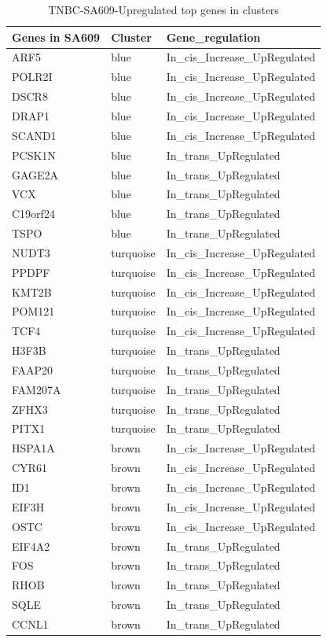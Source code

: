 \begin{table}[htbp]
   \centering
   \caption{TNBC-SA609-Upregulated top genes in clusters}
     \begin{tabular}{|l|l|l|}
     \hline
     Genes in SA609 & Cluster & Gene\_regulation \\
     \hline
     ARF5 & blue & In\_cis\_Increase\_UpRegulated \\
     POLR2I & blue & In\_cis\_Increase\_UpRegulated \\
     DSCR8 & blue & In\_cis\_Increase\_UpRegulated \\
     DRAP1 & blue & In\_cis\_Increase\_UpRegulated \\
     SCAND1 & blue & In\_cis\_Increase\_UpRegulated \\
     PCSK1N & blue & In\_trans\_UpRegulated \\
     GAGE2A & blue & In\_trans\_UpRegulated \\
     VCX & blue & In\_trans\_UpRegulated \\
     C19orf24 & blue & In\_trans\_UpRegulated \\
     TSPO & blue & In\_trans\_UpRegulated \\
     NUDT3 & turquoise & In\_cis\_Increase\_UpRegulated \\
     PPDPF & turquoise & In\_cis\_Increase\_UpRegulated \\
     KMT2B & turquoise & In\_cis\_Increase\_UpRegulated \\
     POM121 & turquoise & In\_cis\_Increase\_UpRegulated \\
     TCF4 & turquoise & In\_cis\_Increase\_UpRegulated \\
     H3F3B & turquoise & In\_trans\_UpRegulated \\
     FAAP20 & turquoise & In\_trans\_UpRegulated \\
     FAM207A & turquoise & In\_trans\_UpRegulated \\
     ZFHX3 & turquoise & In\_trans\_UpRegulated \\
     PITX1 & turquoise & In\_trans\_UpRegulated \\
     HSPA1A & brown & In\_cis\_Increase\_UpRegulated \\
     CYR61 & brown & In\_cis\_Increase\_UpRegulated \\
     ID1 & brown & In\_cis\_Increase\_UpRegulated \\
     EIF3H & brown & In\_cis\_Increase\_UpRegulated \\
     OSTC & brown & In\_cis\_Increase\_UpRegulated \\
     EIF4A2 & brown & In\_trans\_UpRegulated \\
     FOS & brown & In\_trans\_UpRegulated \\
     RHOB & brown & In\_trans\_UpRegulated \\
     SQLE & brown & In\_trans\_UpRegulated \\
     CCNL1 & brown & In\_trans\_UpRegulated \\
     \hline
     \end{tabular}%
   \label{tab:SA609upregulatedgenesinclusters}%
 \end{table}%
